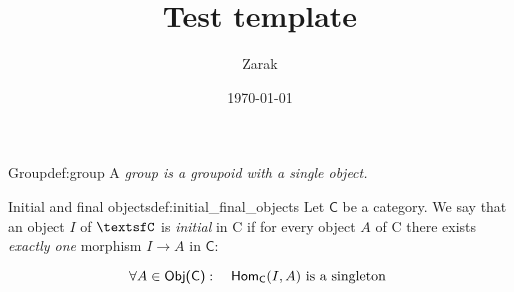 \documentclass[a4paper]{article}
\title{Test template}
\author{Zarak}
\date{\today}
\newcommand{\cat}{%
  \textsf%
}
\theoremstyle{definition}
\begin{document}
\maketitle

\begin{definition}{Group}{def:group}
  A \em{group} is a groupoid with a single object.
\end{definition}

\begin{definition}{Initial and final objects}{def:initial_final_objects}
  Let $\cat{C}$ be a category. We say that an object $I$ of $\cat C$ is
  \textit{initial} in \cat{C} if for every object $A$ of \cat{C} there exists
  \textit{exactly one} morphism $I \to  A$ in $\cat{C}$:

  \begin{equation*}
    \forall A \in \cat{Obj(C)} : \quad \cat{Hom}_\cat{C}(I, A) \text{ is
    a singleton }
  \end{equation*}
\end{definition}
\end{document}

